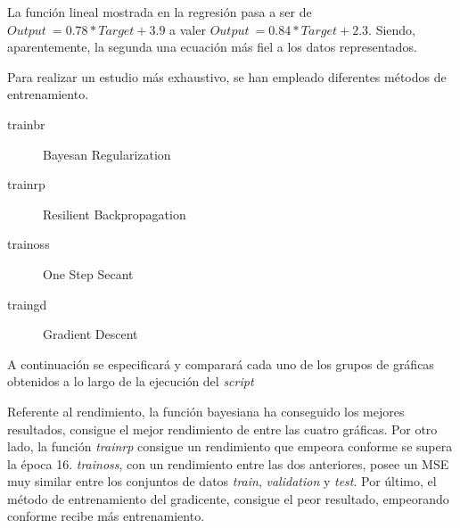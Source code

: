 \documentclass{article}
\begin{document}
La función lineal mostrada en la regresión pasa a ser de $Output ~= 0.78*Target
+ 3.9$ a valer $Output ~= 0.84*Target + 2.3$. Siendo, aparentemente, la segunda
una ecuación más fiel a los datos representados.

Para realizar un estudio más exhaustivo, se han empleado diferentes métodos de
entrenamiento.

\begin{description}
\item [trainbr] Bayesan Regularization
\item [trainrp] Resilient Backpropagation
\item [trainoss] One Step Secant
\item [traingd] Gradient Descent
\end{description}

A continuación se especificará y comparará cada uno de los grupos de gráficas
obtenidos a lo largo de la ejecución del \textit{script}

Referente al rendimiento, la función bayesiana ha conseguido los mejores
resultados, consigue el mejor rendimiento de entre las cuatro gráficas. Por otro
lado, la función \textit{trainrp} consigue un rendimiento que empeora conforme
se supera la época 16. \textit{trainoss}, con un rendimiento entre las dos
anteriores, posee un MSE muy similar entre los conjuntos de datos
\textit{train}, \textit{validation} y \textit{test}. Por último, el método de
entrenamiento del gradicente, consigue el peor resultado, empeorando conforme
recibe más entrenamiento.
\end{document}
